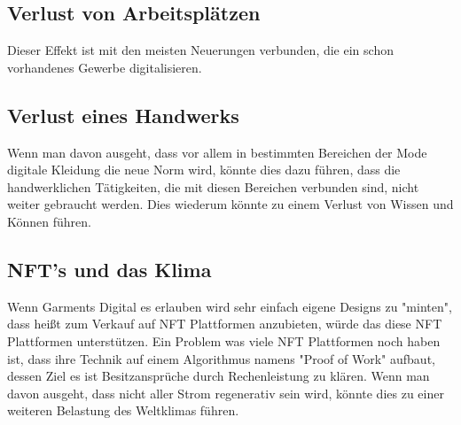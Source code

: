 \documentclass{article}
\begin{document}
\subsection{Verlust von Arbeitsplätzen}
Dieser Effekt ist mit den meisten Neuerungen verbunden, die ein schon vorhandenes Gewerbe digitalisieren.

\subsection{Verlust eines Handwerks}
Wenn man davon ausgeht, dass vor allem in bestimmten Bereichen der Mode digitale Kleidung die neue Norm wird, könnte dies dazu führen, dass die handwerklichen Tätigkeiten, die mit diesen Bereichen verbunden sind, nicht weiter gebraucht werden. Dies wiederum könnte zu einem Verlust von Wissen und Können führen.

\subsection{NFT's und das Klima}
Wenn Garments Digital es erlauben wird sehr einfach eigene Designs zu "minten", dass heißt zum Verkauf auf NFT Plattformen anzubieten, würde das diese NFT Plattformen unterstützen. Ein Problem was viele NFT Plattformen noch haben ist, dass ihre Technik auf einem Algorithmus namens "Proof of Work" aufbaut, dessen Ziel es ist Besitzansprüche durch Rechenleistung zu klären. Wenn man davon ausgeht, dass nicht aller Strom regenerativ sein wird, könnte dies zu einer weiteren Belastung des Weltklimas führen.


\newpage
\end{document}
